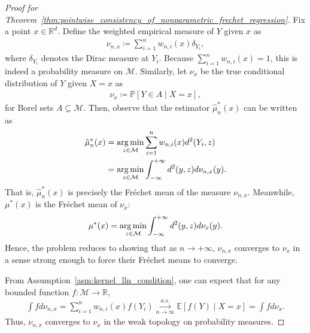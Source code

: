 \begin{proof}[Proof for Theorem~\ref{thm:pointwise_consistency_of_nonparametric_frechet_regression}]
    Fix a point $x \in \mathbb{R}^d$.
    Define the weighted empirical measure of $Y$ given $x$ as
    \begin{align*}
        \nu_{n,x} \coloneqq \sum^n_{i=1}w_{n,i}(x)\delta_{Y_i},
    \end{align*}
    where $\delta_{Y_i}$ denotes the Dirac measure at $Y_i$.
    Because $\sum^n_{i=1}w_{n,i}(x) = 1$, this is indeed a probability measure on $\mathcal{M}$.
    Similarly, let $\nu_x$ be the true conditional distribution of $Y$ given $X = x$ as
    \begin{align*}
        \nu_x \coloneqq \mathbb{P}\left[Y \in A \mid X = x\right],
    \end{align*}
    for Borel sets $A \subseteq \mathcal{M}$.
    Then, observe that the estimator $\hat{\mu}^*_n(x)$ can be written as
    \begin{align*}
        \hat{\mu}^*_n(x) &= \operatorname*{arg\,min}_{z \in \mathcal{M}} \sum^n_{i=1} w_{n,i}(x) d^2(Y_i, z) \\
        &= \operatorname*{arg\,min}_{z \in \mathcal{M}} \int^{+\infty}_{-\infty} d^2(y, z)d\nu_{n,x}(y).
    \end{align*}
    That is, $\hat{\mu}^*_n(x)$ is precisely the Fréchet mean of the measure $\nu_{n,x}$.
    Meanwhile, $\mu^*(x)$ is the Fréchet mean of $\nu_x$:
    \begin{align*}
        \mu^*(x) = \operatorname*{arg\,min}_{z \in \mathcal{M}}\int^{+\infty}_{-\infty}d^2(y, z)d\nu_x(y).
    \end{align*}
    Hence, the problem reduces to showing that as $n \to +\infty$, $\nu_{n,x}$ converges to $\nu_x$ in a sense strong enough to force their Fréchet means to converge.

    From Assumption~\ref{asm:kernel_lln_condition}, one can expect that for any bounded function $f\colon \mathcal{M} \to \mathbb{R}$,
    \begin{align*}
        \int f d\nu_{n,x} = \sum^n_{i=1} w_{n,i}(x) f(Y_i) \overset{a.s.}{\underset{n\to\infty}{\to}} \mathbb{E}[f(Y) \mid X = x] = \int f d\nu_x.
    \end{align*}
    Thus, $\nu_{n,x}$ converges to $\nu_x$ in the weak topology on probability measures.


\end{proof}
